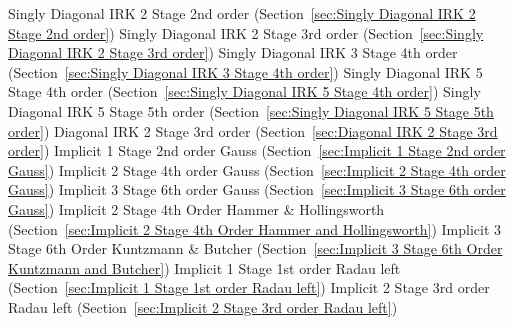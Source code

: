 \begin{list}{}
      \newline 
    Singly Diagonal IRK 2 Stage 2nd order (Section~\ref{sec:Singly Diagonal IRK 2 Stage 2nd order})
      \newline 
    Singly Diagonal IRK 2 Stage 3rd order (Section~\ref{sec:Singly Diagonal IRK 2 Stage 3rd order})
      \newline 
    Singly Diagonal IRK 3 Stage 4th order (Section~\ref{sec:Singly Diagonal IRK 3 Stage 4th order})
      \newline 
    Singly Diagonal IRK 5 Stage 4th order (Section~\ref{sec:Singly Diagonal IRK 5 Stage 4th order})
      \newline 
    Singly Diagonal IRK 5 Stage 5th order (Section~\ref{sec:Singly Diagonal IRK 5 Stage 5th order})
      \newline 
    Diagonal IRK 2 Stage 3rd order (Section~\ref{sec:Diagonal IRK 2 Stage 3rd order})
      \newline 
    Implicit 1 Stage 2nd order Gauss (Section~\ref{sec:Implicit 1 Stage 2nd order Gauss})
      \newline 
    Implicit 2 Stage 4th order Gauss (Section~\ref{sec:Implicit 2 Stage 4th order Gauss})
      \newline 
    Implicit 3 Stage 6th order Gauss (Section~\ref{sec:Implicit 3 Stage 6th order Gauss})
      \newline 
    Implicit 2 Stage 4th Order Hammer \& Hollingsworth (Section~\ref{sec:Implicit 2 Stage 4th Order Hammer and Hollingsworth})
      \newline 
    Implicit 3 Stage 6th Order Kuntzmann \& Butcher (Section~\ref{sec:Implicit 3 Stage 6th Order Kuntzmann and Butcher})
      \newline 
    Implicit 1 Stage 1st order Radau left (Section~\ref{sec:Implicit 1 Stage 1st order Radau left})
      \newline 
    Implicit 2 Stage 3rd order Radau left (Section~\ref{sec:Implicit 2 Stage 3rd order Radau left})

\end{list}
